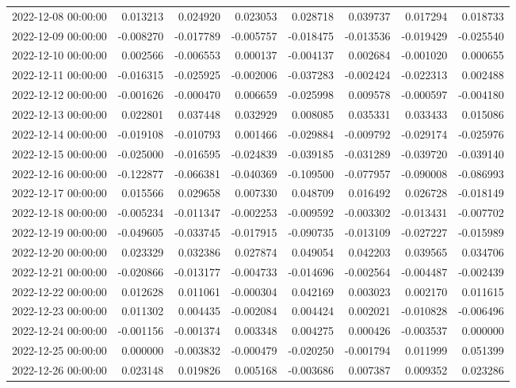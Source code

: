 \begin{tabular}{lrrrrrrr}
2022-12-08 00:00:00 & 0.013213 & 0.024920 & 0.023053 & 0.028718 & 0.039737 & 0.017294 & 0.018733 \\
2022-12-09 00:00:00 & -0.008270 & -0.017789 & -0.005757 & -0.018475 & -0.013536 & -0.019429 & -0.025540 \\
2022-12-10 00:00:00 & 0.002566 & -0.006553 & 0.000137 & -0.004137 & 0.002684 & -0.001020 & 0.000655 \\
2022-12-11 00:00:00 & -0.016315 & -0.025925 & -0.002006 & -0.037283 & -0.002424 & -0.022313 & 0.002488 \\
2022-12-12 00:00:00 & -0.001626 & -0.000470 & 0.006659 & -0.025998 & 0.009578 & -0.000597 & -0.004180 \\
2022-12-13 00:00:00 & 0.022801 & 0.037448 & 0.032929 & 0.008085 & 0.035331 & 0.033433 & 0.015086 \\
2022-12-14 00:00:00 & -0.019108 & -0.010793 & 0.001466 & -0.029884 & -0.009792 & -0.029174 & -0.025976 \\
2022-12-15 00:00:00 & -0.025000 & -0.016595 & -0.024839 & -0.039185 & -0.031289 & -0.039720 & -0.039140 \\
2022-12-16 00:00:00 & -0.122877 & -0.066381 & -0.040369 & -0.109500 & -0.077957 & -0.090008 & -0.086993 \\
2022-12-17 00:00:00 & 0.015566 & 0.029658 & 0.007330 & 0.048709 & 0.016492 & 0.026728 & -0.018149 \\
2022-12-18 00:00:00 & -0.005234 & -0.011347 & -0.002253 & -0.009592 & -0.003302 & -0.013431 & -0.007702 \\
2022-12-19 00:00:00 & -0.049605 & -0.033745 & -0.017915 & -0.090735 & -0.013109 & -0.027227 & -0.015989 \\
2022-12-20 00:00:00 & 0.023329 & 0.032386 & 0.027874 & 0.049054 & 0.042203 & 0.039565 & 0.034706 \\
2022-12-21 00:00:00 & -0.020866 & -0.013177 & -0.004733 & -0.014696 & -0.002564 & -0.004487 & -0.002439 \\
2022-12-22 00:00:00 & 0.012628 & 0.011061 & -0.000304 & 0.042169 & 0.003023 & 0.002170 & 0.011615 \\
2022-12-23 00:00:00 & 0.011302 & 0.004435 & -0.002084 & 0.004424 & 0.002021 & -0.010828 & -0.006496 \\
2022-12-24 00:00:00 & -0.001156 & -0.001374 & 0.003348 & 0.004275 & 0.000426 & -0.003537 & 0.000000 \\
2022-12-25 00:00:00 & 0.000000 & -0.003832 & -0.000479 & -0.020250 & -0.001794 & 0.011999 & 0.051399 \\
2022-12-26 00:00:00 & 0.023148 & 0.019826 & 0.005168 & -0.003686 & 0.007387 & 0.009352 & 0.023286 \\

\end{tabular}
